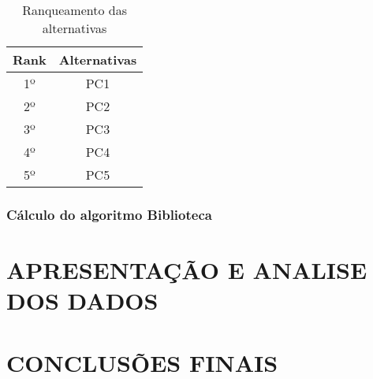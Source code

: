 \documentclass[12pt]{article}[abntex2]
\begin{document}
\newpage
\begin{table}[ht]
\centering
\begin{adjustbox}{width=0.5\textwidth}
\small
\begin{tabular}{|c|c|}
   \hline
   Rank & Alternativas \\
   \hline
   1º & PC1  \\
   2º & PC2  \\
   3º & PC3 \\
   4º & PC4  \\
   5º & PC5  \\
   \hline
\end{tabular}
\end{adjustbox}
\caption{Ranqueamento das alternativas}
\label{tab:rank}
\end{table} 

\subsubsection{Cálculo do algoritmo Biblioteca}

\section{APRESENTAÇÃO E ANALISE DOS DADOS}
\section{CONCLUSÕES FINAIS}

\newpage

\end{document}
